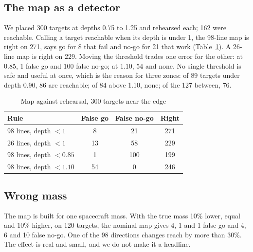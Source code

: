 \documentclass[conference]{IEEEtran}
\begin{document}
\subsection{The map as a detector}\label{sec:map}
We placed 300 targets at depths 0.75 to 1.25 and rehearsed each; 162 were reachable. Calling a target
reachable when its depth is under 1, the 98-line map is right on 271, says go for 8 that fail and no-go
for 21 that work (Table~\ref{tab:map}). A 26-line map is right on 229. Moving the threshold trades one error
for the other: at 0.85, 1 false go and 100 false no-go; at 1.10, 54 and none. No single threshold is safe
and useful at once, which is the reason for three zones: of 89 targets under depth 0.90, 86 are reachable;
of 84 above 1.10, none; of the 127 between, 76.

\begin{table}[t]
\caption{Map against rehearsal, 300 targets near the edge}\label{tab:map}
\centering\begin{tabular}{lccc}\toprule
Rule & False go & False no-go & Right\\\midrule
98 lines, depth $<1$ & 8 & 21 & 271\\
26 lines, depth $<1$ & 13 & 58 & 229\\
98 lines, depth $<0.85$ & 1 & 100 & 199\\
98 lines, depth $<1.10$ & 54 & 0 & 246\\\bottomrule
\end{tabular}\end{table}

\subsection{Wrong mass}
The map is built for one spacecraft mass. With the true mass 10\% lower, equal and 10\% higher, on 120
targets, the nominal map gives 4, 1 and 1 false go and 4, 6 and 10 false no-go. One of the 98 directions
changes reach by more than 30\%. The effect is real and small, and we do not make it a headline.
\end{document}
